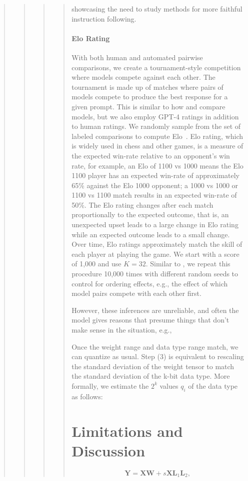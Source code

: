 \begin{quote}
\begin{quote}
\begin{quote}
\begin{quote}
showcasing the need to study methods for more faithful instruction following.

\paragraph{Elo Rating} With both human and automated pairwise comparisons, we create a tournament-style competition where models compete against each other. The tournament is made up of matches where pairs of models compete to produce the best response for a given prompt. This is similar to how \citet{bai2022training} and \citet{vicuna2023} compare models, but we also employ GPT-4 ratings in addition to human ratings. We randomly sample from the set of labeled comparisons to compute Elo~\citep{elo1967proposed,elo1978rating}. Elo rating, which is widely used in chess and other games, is a measure of the expected win-rate relative to an opponent's win rate, for example, an Elo of 1100 vs 1000 means the Elo 1100 player has an expected win-rate of approximately 65\% against the Elo 1000 opponent; a 1000 vs 1000 or 1100 vs 1100 match results in an expected win-rate of 50\%. The Elo rating changes after each match proportionally to the expected outcome, that is, an unexpected upset leads to a large change in Elo rating while an expected outcome leads to a small change. Over time, Elo ratings approximately match the skill of each player at playing the game. We start with a score of 1,000 and use $K=32$. Similar to \citet{vicuna2023}, we repeat this procedure 10,000 times with different random seeds to control for ordering effects, e.g., the effect of which model pairs compete with each other first.

However, these inferences are unreliable, and often the model gives reasons that presume things that don't make sense in the situation, e.g.,

Once the weight range and data type range match, we can quantize as usual. Step (3) is equivalent to rescaling the standard deviation of the weight tensor to match the standard deviation of the k-bit data type. More formally, we estimate the $2^k$ values $q_i$ of the data type as follows:

\section{Limitations and Discussion}

\begin{equation}
    \mathbf{Y} = \mathbf{X}\mathbf{W} + s\mathbf{X}\mathbf{L}_1\mathbf{L}_2,
\end{equation}


\end{quote}
\end{quote}
\end{quote}
\end{quote}
